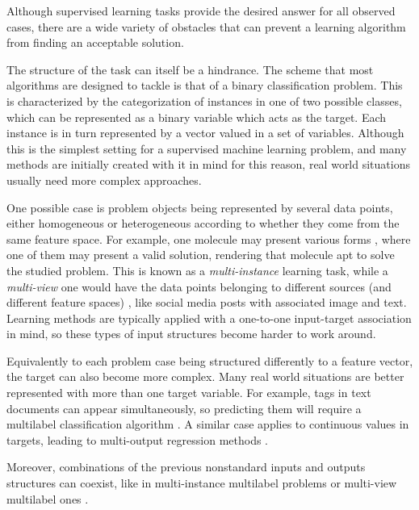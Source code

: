 Although supervised learning tasks provide the desired answer for all observed cases, there are a wide variety of obstacles that can prevent a learning algorithm from finding an acceptable solution.

The structure of the task can itself be a hindrance. The scheme that most algorithms are designed to tackle is that of a binary classification problem. This is characterized by the categorization of instances in one of two possible classes, which can be represented as a binary variable which acts as the target. Each instance is in turn represented by a vector valued in a set of variables. Although this is the simplest setting for a supervised machine learning problem, and many methods are initially created with it in mind for this reason, real world situations usually need more complex approaches.

One possible case is problem objects being represented by several data points, either homogeneous or heterogeneous according to whether they come from the same feature space. For example, one molecule may present various forms , where one of them may present a valid solution, rendering that molecule apt to solve the studied problem. This is known as a \textit{multi-instance} learning task, while a \textit{multi-view} one would have the data points belonging to different sources (and different feature spaces) , like social media posts with associated image and text. Learning methods are typically applied with a one-to-one input-target association in mind, so these types of input structures become harder to work around.

Equivalently to each problem case being structured differently to a feature vector, the target can also become more complex. Many real world situations are better represented with more than one target variable. For example, tags in text documents can appear simultaneously, so predicting them will require a multilabel classification algorithm . A similar case applies to continuous values in targets, leading to multi-output regression methods .

Moreover, combinations of the previous nonstandard inputs and outputs structures can coexist, like in multi-instance multilabel problems  or multi-view multilabel ones .


